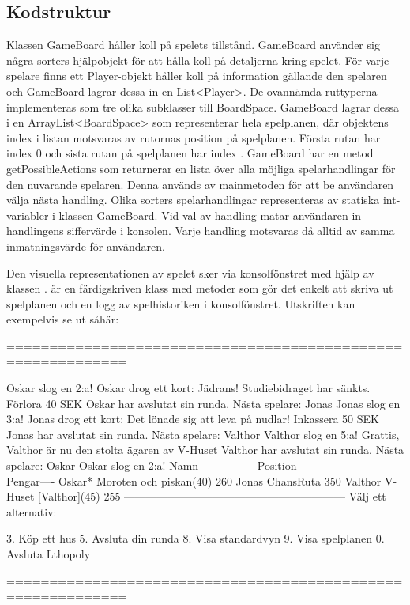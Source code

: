 \subsection{Kodstruktur}
Klassen GameBoard håller koll på spelets tillstånd.
GameBoard använder sig några sorters hjälpobjekt för att hålla koll på detaljerna kring spelet. 
För varje spelare finns ett Player-objekt håller koll på information gällande den spelaren och GameBoard lagrar dessa in en List<Player>.
De ovannämda ruttyperna implementeras som tre olika subklasser till BoardSpace. GameBoard lagrar dessa i en ArrayList<BoardSpace> som representerar hela spelplanen, där objektens index i listan motsvaras av rutornas position på spelplanen. Första rutan har index 0 och sista rutan på spelplanen har index .
GameBoard har en metod getPossibleActions som returnerar en lista över alla möjliga spelarhandlingar för den nuvarande spelaren. Denna används av mainmetoden för att be användaren välja nästa handling. 
Olika sorters spelarhandlingar representeras av statiska int-variabler i klassen GameBoard. Vid val av handling matar användaren in handlingens siffervärde i konsolen. Varje handling motsvaras då alltid av samma inmatningsvärde för användaren.




Den visuella representationen av spelet sker via konsolfönstret med hjälp av klassen .  är en färdigskriven klass med metoder som gör det enkelt att skriva ut spelplanen och en logg av spelhistoriken i konsolfönstret. Utskriften kan exempelvis se ut såhär:

\begin{REPL}
============================================================

Oskar slog en 2:a!
Oskar drog ett kort: Jädrans! Studiebidraget har sänkts. Förlora 40 SEK
Oskar har avslutat sin runda.
Nästa spelare: Jonas
Jonas slog en 3:a!
Jonas drog ett kort: Det lönade sig att leva på nudlar! Inkassera 50 SEK
Jonas har avslutat sin runda.
Nästa spelare: Valthor
Valthor slog en 5:a!
Grattis, Valthor är nu den stolta ägaren av V-Huset
Valthor har avslutat sin runda.
Nästa spelare: Oskar
Oskar slog en 2:a!
Namn----------------Position----------------------Pengar----
Oskar*              Moroten och piskan(40)        260       
Jonas               ChansRuta                     350       
Valthor             V-Huset [Valthor](45)         255       
------------------------------------------------------------
Välj ett alternativ:

	3. Köp ett hus                   
	5. Avsluta din runda             
	8. Visa standardvyn              
	9. Visa spelplanen               
	0. Avsluta Lthopoly              

============================================================

\end{REPL}

